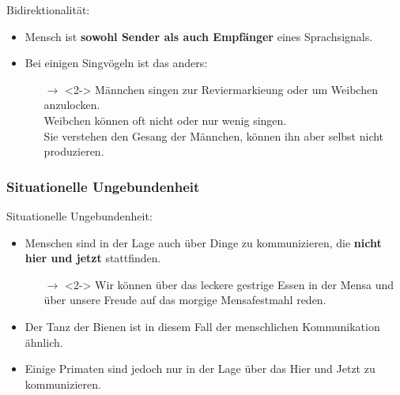 \begin{frame}{Bidirektionalität:}

	\begin{itemize}
		\item[]
		\item<1-> Mensch ist \textbf{sowohl Sender als auch Empfänger} eines Sprachsignals.
		\item[]
		\item<2-> Bei einigen Singvögeln ist das anders:
		
		\begin{itemize}
			\item[]
			\item[$\rightarrow$]<2-> Männchen singen zur Reviermarkieung oder um
                          Weibchen anzulocken.\\
                         Weibchen können oft nicht oder nur wenig singen.\\
                         Sie verstehen den Gesang der Männchen, können ihn aber selbst nicht produzieren.
		\end{itemize}
			
	\end{itemize}

\end{frame}


\subsubsection{Situationelle Ungebundenheit}

\begin{frame}{Situationelle Ungebundenheit:}
	
	\begin{itemize}
		\item[]
		\item<1-> Menschen sind in der Lage auch über Dinge zu kommunizieren, die \textbf{nicht hier und jetzt} stattfinden.
		
		\begin{itemize}
			\item[]
			\item[$\rightarrow$]<2-> Wir können über das leckere gestrige Essen in der Mensa und über unsere Freude auf das morgige Mensafestmahl reden.
		\end{itemize}
		
		\item[]
		\item<3-> Der Tanz der Bienen ist in diesem Fall der menschlichen Kommunikation ähnlich.
		\item[]
		\item<3-> Einige Primaten sind jedoch nur in der Lage über das Hier und Jetzt zu kommunizieren.
	\end{itemize}
		
\end{frame}



